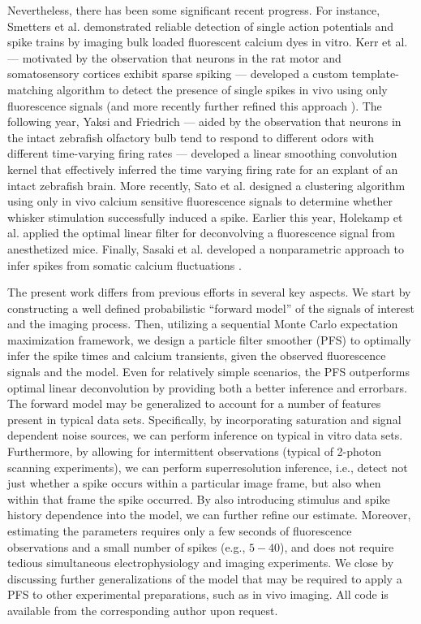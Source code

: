 \documentclass[10pt]{article}
\begin{document}
Nevertheless, there has been some significant recent progress.  For instance, Smetters et al.  \cite{SmettersYuste99} demonstrated reliable detection of  single action potentials and spike trains by imaging bulk loaded fluorescent calcium dyes in vitro. Kerr et al. \cite{KerrHelmchen05} --- motivated by the observation that neurons in the rat motor and somatosensory cortices exhibit sparse spiking --- developed a custom template-matching algorithm to detect the presence of single spikes in vivo using only fluorescence signals (and more recently further refined this approach \cite{GreenbergKerr08}).  The following year, Yaksi and Friedrich  \cite{YaksiFriedrich06} --- aided by the observation that neurons in the intact zebrafish olfactory bulb tend to respond to different odors with different time-varying firing rates --- developed a linear smoothing convolution kernel that effectively inferred the time varying firing rate for an explant of an intact zebrafish brain.  More recently, Sato et al.  \cite{SatoSvoboda07} designed a clustering algorithm using only in vivo calcium sensitive fluorescence signals to determine whether whisker stimulation successfully induced a spike. Earlier this year, Holekamp et al. \cite{HolekampHoly08} applied the optimal linear filter for deconvolving a fluorescence signal from anesthetized mice. Finally, Sasaki et al. developed a nonparametric approach to infer spikes from somatic calcium fluctuations \cite{SasakiIkegaya08}. 

The present work differs from previous efforts in several key aspects.  We start by constructing a well defined probabilistic ``forward model'' of the signals of interest and the imaging process.  Then, utilizing a sequential Monte Carlo expectation maximization framework, we design a particle filter smoother (PFS) to optimally infer the spike times and calcium transients, given the observed fluorescence signals and the model. Even for relatively simple scenarios, the PFS outperforms optimal linear deconvolution by providing both a better inference and errorbars. The forward model may be generalized to account for a number of features present in typical data sets. Specifically, by incorporating saturation and signal dependent noise sources, we can perform inference on typical in vitro data sets.  Furthermore, by allowing for intermittent observations (typical of 2-photon scanning experiments), we can perform superresolution inference, i.e., detect not just whether a spike occurs within a particular image frame, but also when within that frame the spike occurred. By also introducing stimulus and spike history dependence into the model, we can further refine our estimate. Moreover, estimating the parameters requires only a few seconds of fluorescence observations and a small number of spikes (e.g., $5-40$), and does not require tedious simultaneous electrophysiology and imaging experiments. We close by discussing further generalizations of the model that may be required to apply a PFS to other experimental preparations, such as in vivo imaging. All code is available from the corresponding author upon request.
\end{document}

